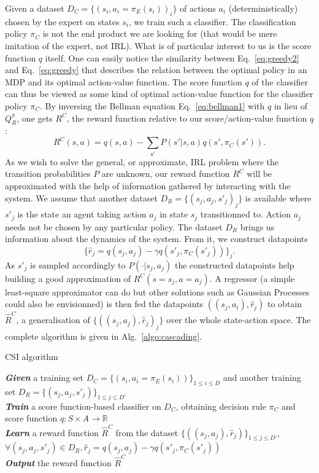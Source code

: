 \documentclass[smallextended]{svjour3}
\begin{document}
Given a dataset $D_C = \{(s_i,a_i=\pi_E(s_i))_i\}$ of actions $a_i$ (deterministically) chosen by the expert on states $s_i$, we train such a classifier. The classification policy $\pi_C$ is not the end product we are looking for (that would be mere imitation of the expert, not IRL). What is of particular interest to us is the score function $q$ itself. One can easily notice the similarity between Eq.~\eqref{eq:greedy2} and Eq.~\eqref{eq:greedy} that describes the relation between the optimal policy in an MDP and its optimal action-value function. The score function $q$ of the classifier can thus be viewed as some kind of optimal action-value function for the classifier policy $\pi_C$. By inversing the Bellman equation Eq.~\eqref{eq:bellman1} with $q$ in lieu of $Q^\pi_R$, one gets $R^C$, the reward function relative to our score/action-value function $q$:
\begin{equation}
  \label{eq:rc}
  R^C(s,a) =q(s,a) - \sum_{\mathrm{s'}}P(s'|s,a)q(s',\pi_C(s')).
\end{equation}
As we wish to solve the general, or approximate, IRL problem where the transition probabilities $P$ are unknown, our reward function $R^C$ will be approximated with the help of information gathered by interacting with the system. We assume that another dataset $D_R = \{(s_j,a_j,s'_j)_j\}$ is available where $s'_j$ is the state an agent taking action $a_j$ in state $s_j$ transitionned to. Action $a_j$ needs not be chosen by any particular policy. The dataset $D_R$ brings us information about the dynamics of the system. From it, we construct datapoints
\begin{equation}
  \label{eq:rj}
  \{\hat r_j = q(s_j,a_j) - \gamma q(s'_j,\pi_C(s'_j))\}_j.
\end{equation}
As $s'_j$ is sampled accordingly to $P(\cdot|s_j,a_j)$ the constructed datapoints help building a good approximation of $R^C(s=s_j,a=a_j)$. A regressor (a simple least-square approximator can do but other solutions such as Gaussian Processes \cite{rasmussen2006gaussian} could also be envisionned) is then fed the datapoints $((s_j,a_i),\hat r_j)$ to obtain $\hat R^C$, a generalisation of $\{((s_j,a_j),\hat r_j)_j\}$ over the whole state-action space. The complete algorithm is given in Alg.~\ref{algo:cascading}.
\begin{algorithm}%
  \caption{CSI algorithm}
  \label{algo:cascading}
  \emph{\textbf{Given}} a training set $D_C=\{(s_i,a_i=\pi_E(s_i))\}_{1\leq i \leq D}$ and another training set $D_R=\{(s_{j},a_{j},s'_{j})\}_{1\leq j \leq D'}$\;\\
  \emph{\textbf{Train}} a score function-based classifier on $D_C$, obtaining decision rule $\pi_C$ and score function $q:S\times A \rightarrow \mathbb R$\;\\
  \emph{\textbf{Learn}} a reward function $\hat R^C$ from the dataset $\{((s_{j},a_{j}),\hat{r}_j)\}_{1\leq j \leq D'}$, $\forall (s_j,a_j,s'_j) \in D_R,\hat{r}_j=q(s_{j},a_{j})-\gamma q(s'_{j},\pi_C(s'_{j}))$\;\\
  \emph{\textbf{Output}} the reward function $\hat R^{C}$ \;
\end{algorithm}
\end{document}
